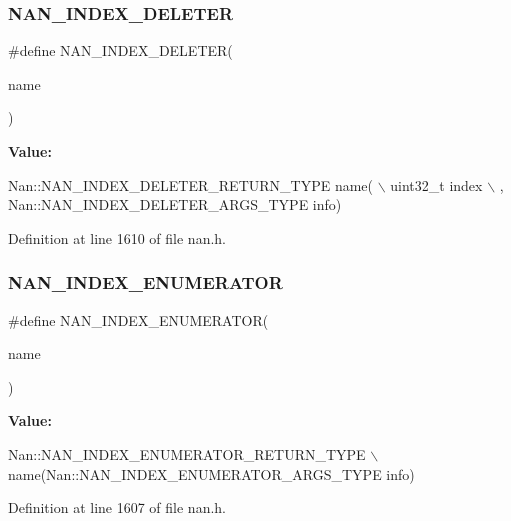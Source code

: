 \subsubsection{N\+A\+N\+\_\+\+I\+N\+D\+E\+X\+\_\+\+D\+E\+L\+E\+T\+ER}
{\footnotesize\ttfamily \#define N\+A\+N\+\_\+\+I\+N\+D\+E\+X\+\_\+\+D\+E\+L\+E\+T\+ER(\begin{DoxyParamCaption}\item[{}]{name }\end{DoxyParamCaption})}

{\bfseries Value\+:}
\begin{DoxyCode}
Nan::NAN_INDEX_DELETER_RETURN_TYPE name(                                   \(\backslash\)
        uint32\_t index                                                         \(\backslash\)
      , Nan::NAN_INDEX_DELETER_ARGS_TYPE info)
\end{DoxyCode}


Definition at line 1610 of file nan.\+h.

\mbox{\label{nan_8h_ad3fc53ebce6ec5579f171b8aa64c219f}} 
\subsubsection{N\+A\+N\+\_\+\+I\+N\+D\+E\+X\+\_\+\+E\+N\+U\+M\+E\+R\+A\+T\+OR}
{\footnotesize\ttfamily \#define N\+A\+N\+\_\+\+I\+N\+D\+E\+X\+\_\+\+E\+N\+U\+M\+E\+R\+A\+T\+OR(\begin{DoxyParamCaption}\item[{}]{name }\end{DoxyParamCaption})}

{\bfseries Value\+:}
\begin{DoxyCode}
Nan::NAN\_INDEX\_ENUMERATOR\_RETURN\_TYPE                                      \(\backslash\)
    name(Nan::NAN_INDEX_ENUMERATOR_ARGS_TYPE info)
\end{DoxyCode}


Definition at line 1607 of file nan.\+h.

\mbox{\label{nan_8h_a8cb2f66902b1d0e9579a40a3e83f1715}} 
